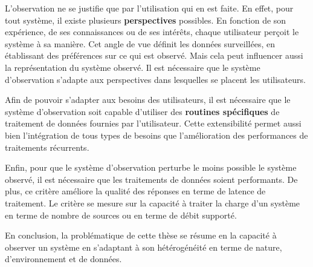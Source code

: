 L'observation ne se justifie que par l'utilisation qui en est faite. En effet, pour tout système, il existe plusieurs \textbf{perspectives} possibles. En fonction de son expérience, de ses connaissances ou de ses intérêts, chaque utilisateur perçoit le système à sa manière. Cet angle de vue définit les données surveillées, en établissant des préférences sur ce qui est observé. Mais cela peut influencer aussi la représentation du système observé. Il est nécessaire que le système d'observation s'adapte aux perspectives dans lesquelles se placent les utilisateurs.

Afin de pouvoir s'adapter aux besoins des utilisateurs, il est nécessaire que le système d'observation soit capable d'utiliser des \textbf{routines spécifiques} de traitement de données fournies par l'utilisateur. Cette extensibilité permet aussi bien l'intégration de tous types de besoins que l'amélioration des performances de traitements récurrents.

Enfin, pour que le système d'observation perturbe le moins possible le système observé, il est nécessaire que les traitements de données soient performants. De plus, ce critère améliore la qualité des réponses en terme de latence de traitement. Le critère se mesure sur la capacité à traiter la charge d'un système en terme de nombre de sources ou en terme de débit supporté.

En conclusion, la problématique de cette thèse se résume en la capacité à observer un système en s'adaptant à son hétérogénéité en terme de nature, d'environnement et de données.